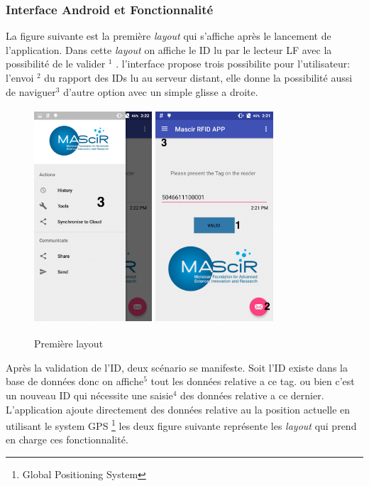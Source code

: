 \documentclass[11pt, a4paper, twoside]{book}
\begin{document}
\subsubsection{Interface Android et Fonctionnalité}
La figure suivante est la première \emph{layout} qui s'affiche après le lancement de l'application. Dans cette \emph{layout} on affiche le ID lu par le lecteur LF avec la possibilité de le valider \(^{1}\) . l'interface propose trois possibilite pour l'utilisateur: l'envoi \(^{2}\) du rapport des IDs lu au serveur distant, elle donne la possibilité aussi de naviguer\(^{3}\) d'autre option avec un simple glisse a droite.
\begin{figure}[H]
\centering
\includegraphics[width=4.4cm,height=8cm]{rightmenu}
\includegraphics[width=4.4cm,height=8cm]{1}
\caption{Première layout}
\end{figure}

Après la validation de l'ID, deux scénario se manifeste. Soit l'ID existe dans la base de données donc on affiche\(^{5}\) tout les données relative a ce tag. ou bien c'est un nouveau ID qui nécessite une saisie\(^{4}\) des données relative a ce dernier. L'application ajoute directement des données relative au la position actuelle en utilisant le system GPS \footnote{Global Positioning System} les deux figure suivante représente les \emph{layout} qui prend en charge ces fonctionnalité.
\end{document}

